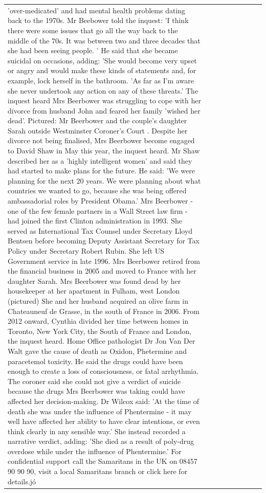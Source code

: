 \begin{table}[H]
\begin{tabular}{lllrlllll}
'over-medicated' and had mental health problems dating back to the 1970s. Mr Beebower told the inquest: 'I think there were some issues that go all the way back to the middle of the 70s. It was between two and three decades that she had been seeing people. ' He said that she became suicidal on occasions, adding: 'She would become very upset or angry and would make these kinds of statements and, for example, lock herself in the bathroom. 'As far as I'm aware she never undertook any action on any of these threats.' The inquest heard Mrs Beerbower was struggling to cope with her divorce from husband John and feared her family 'wished her dead'. Pictured: Mr Beerbower and the couple's daughter Sarah outside Westminster Coroner's Court . Despite her divorce not being finalised, Mrs Beerbower become engaged to David Shaw in May this year, the inquest heard. Mr Shaw described her as a 'highly intelligent women' and said they had started to make plans for the future. He said: 'We were planning for the next 20 years. We were planning about what countries we wanted to go, because she was being offered ambassadorial roles by President Obama.' Mrs Beerbower - one of the few female partners in a Wall Street law firm - had joined the first Clinton administration in 1993. She served as International Tax Counsel under Secretary Lloyd Bentsen before becoming Deputy Assistant Secretary for Tax Policy under Secretary Robert Rubin. She left US Government service in late 1996. Mrs Beerbower retired from the financial business in 2005 and moved to France with her daughter Sarah. Mrs Beerbower was found dead by her housekeeper at her apartment in Fulham, west London (pictured) She and her husband acquired an olive farm in Chateauneuf de Grasse, in the south of France in 2006. From 2012 onward, Cynthia divided her time between homes in Toronto, New York City, the South of France and London, the inquest heard. Home Office pathologist Dr Jon Van Der Walt gave the cause of death as Oxidon, Phetermine and paracetemol toxicity. He said the drugs could have been enough to create a loss of consciousness, or fatal arrhythmia. The coroner said she could not give a verdict of suicide because the drugs Mrs Beerbower was taking could have affected her decision-making. Dr Wilcox said: 'At the time of death she was under the influence of Phentermine - it may well have affected her ability to have clear intentions, or even think clearly in any sensible way.' She instead recorded a narrative verdict, adding: 'She died as a result of poly-drug overdose while under the influence of Phentermine.' For confidential support call the Samaritans in the UK on 08457 90 90 90, visit a local Samaritans branch or click here for details.jó \\

\end{tabular}
\end{table}
